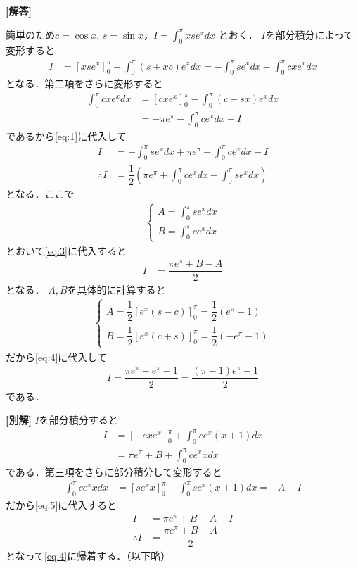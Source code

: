 \documentclass[../../main.tex]{subfiles}
\begin{document}
\begin{oframed}
  
\end{oframed}

{\bf [解答]}

簡単のため$ c = \cos x, \, s = \sin x$，$I = \int_0^\pi x s e^x dx$ とおく．
$I$を部分積分によって変形すると
\begin{align}
  I
  &= [x s e^x]_0^\pi - \int_0^\pi (s + xc) e^x dx = -\int_0^\pi s e^x dx - \int_0^\pi c x e^x dx \label{eq:1}
\end{align}
となる．第二項をさらに変形すると
\begin{align}
  \int_0^\pi c x e^x dx
  &= [c x e^x]_0^\pi - \int_0^\pi (c - s x) e^x dx \\
  &= -\pi e^\pi - \int_0^\pi c e^x dx + I \label{eq:2}
\end{align}
であるから\cref{eq:1}に代入して
\begin{align}
  I &= -\int_0^\pi s e^x dx + \pi e^\pi + \int_0^\pi c e^x dx - I \\
  \therefore
  I &= \dfrac{1}{2}\left(\pi e^\pi + \int_0^\pi c e^x dx -\int_0^\pi s e^x dx\right) \label{eq:3}
\end{align}
となる．ここで
\begin{align}
  \begin{cases}
    A = \int_0^\pi s e^x dx \\
    B = \int_0^\pi c e^x dx
  \end{cases}
\end{align}
とおいて\cref{eq:3}に代入すると
\begin{align}
  I &= \dfrac{\pi e^\pi + B - A}{2} \label{eq:4}
\end{align}
となる．
$A,B$を具体的に計算すると
\begin{align}
  \begin{cases}
    A = \dfrac{1}{2} [e^x(s-c)]_0^\pi = \dfrac{1}{2}(e^\pi + 1) \\[5pt]
    B = \dfrac{1}{2} [e^x(c+s)]_0^\pi = \dfrac{1}{2}(-e^\pi - 1)
  \end{cases}
\end{align}
だから\cref{eq:4}に代入して
\begin{align}
  I = \dfrac{\pi e^\pi - e^\pi - 1}{2} = \dfrac{(\pi-1)e^\pi - 1}{2}
\end{align}
である．

{\bf [別解]}
$I$を部分積分すると
\begin{align}
  I &= [-c x e^x]_0^\pi + \int_0^\pi c e^x(x+1) dx \\
  &= \pi e^\pi + B + \int_0^\pi c e^x x dx  \label{eq:5}
\end{align}
である．第三項をさらに部分積分して変形すると
\begin{align}
  \int_0^\pi c e^x x dx &= [s e^x x]_0^\pi - \int_0^\pi s e^x (x+1) dx = -A - I
\end{align}
だから\cref{eq:5}に代入すると
\begin{align}
  I &= \pi e^\pi + B - A - I \\[5pt]
  \therefore
  I &= \dfrac{\pi e^\pi + B - A}{2}
\end{align}
となって\cref{eq:4}に帰着する．（以下略）
\end{document}
